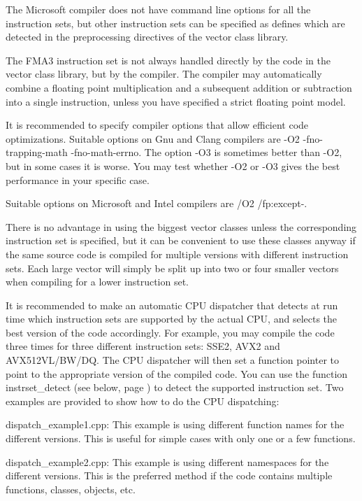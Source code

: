 \documentclass[vcl_manual.tex]{subfiles}
\begin{document}
The Microsoft compiler does not have command line options for all the instruction sets, but other instruction sets can be specified as defines which are detected in the preprocessing directives of the vector class library.

The FMA3 instruction set is not always handled directly by the code in the vector class library, but by the compiler. The compiler may automatically combine a floating point multiplication and a subsequent addition or subtraction into a single instruction, unless you have specified a strict floating point model.

It is recommended to specify compiler options that allow efficient code optimizations. Suitable options on Gnu and Clang compilers are
-O2 -fno-trapping-math -fno-math-errno. The option -O3 is sometimes better than -O2, but in some cases it is worse. You may test whether -O2 or -O3 gives the best performance in your specific case.

Suitable options on Microsoft and Intel compilers are /O2 /fp:except-.

There is no advantage in using the biggest vector classes unless the corresponding instruction set is specified, but it can be convenient to use these classes anyway if the same source code is compiled for multiple versions with different instruction sets. Each large vector will simply be split up into two or four smaller vectors when compiling for a lower instruction set.

It is recommended to make an automatic CPU dispatcher that detects at run time which instruction sets are supported by the actual CPU, and selects the best version of the code accordingly. For example, you may compile the code three times for three different instruction sets: SSE2, AVX2 and AVX512VL/BW/DQ. The CPU dispatcher will then set a function pointer to point to the appropriate version of the compiled code. You can use the function instrset\_detect (see below, page \pageref{instrsetDetect}) to detect the supported instruction set.
Two examples are provided to show how to do the CPU dispatching:

dispatch\_example1.cpp: This example is using different function names for the different versions. This is useful for simple cases with only one or a few functions.

dispatch\_example2.cpp: This example is using different namespaces for the different versions. This is the preferred method if the code contains multiple functions, classes, objects, etc.
\end{document}
